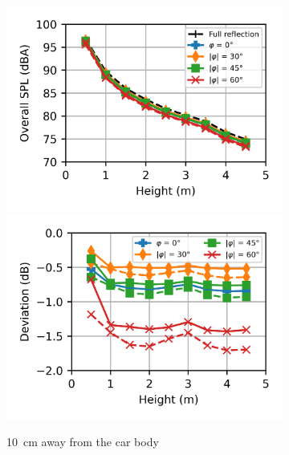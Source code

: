 \begin{figure}
	\centering
	\begin{subfigure}[b]{\textwidth}
		\centering
		\includegraphics{fig/chap5/impedance/overall_SPL/overall_SPL_pos_a.png}
		\includegraphics{fig/chap5/impedance/overall_SPL/deviation_pos_a.png}
		\caption{\SI{10}{\centi\meter} away from the car body}
	\end{subfigure}
	\\
	\begin{subfigure}[b]{\textwidth}
		\centering

\end{subfigure}
\end{figure}
